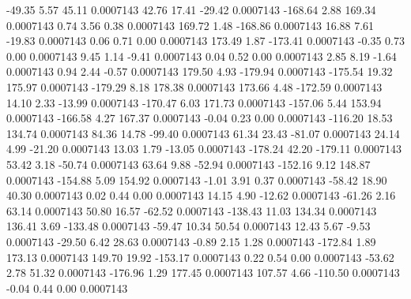       -49.35        5.57       45.11     0.0007143
       42.76       17.41      -29.42     0.0007143
     -168.64        2.88      169.34     0.0007143
        0.74        3.56        0.38     0.0007143
      169.72        1.48     -168.86     0.0007143
       16.88        7.61      -19.83     0.0007143
        0.06        0.71        0.00     0.0007143
      173.49        1.87     -173.41     0.0007143
       -0.35        0.73        0.00     0.0007143
        9.45        1.14       -9.41     0.0007143
        0.04        0.52        0.00     0.0007143
        2.85        8.19       -1.64     0.0007143
        0.94        2.44       -0.57     0.0007143
      179.50        4.93     -179.94     0.0007143
     -175.54       19.32      175.97     0.0007143
     -179.29        8.18      178.38     0.0007143
      173.66        4.48     -172.59     0.0007143
       14.10        2.33      -13.99     0.0007143
     -170.47        6.03      171.73     0.0007143
     -157.06        5.44      153.94     0.0007143
     -166.58        4.27      167.37     0.0007143
       -0.04        0.23        0.00     0.0007143
     -116.20       18.53      134.74     0.0007143
       84.36       14.78      -99.40     0.0007143
       61.34       23.43      -81.07     0.0007143
       24.14        4.99      -21.20     0.0007143
       13.03        1.79      -13.05     0.0007143
     -178.24       42.20     -179.11     0.0007143
       53.42        3.18      -50.74     0.0007143
       63.64        9.88      -52.94     0.0007143
     -152.16        9.12      148.87     0.0007143
     -154.88        5.09      154.92     0.0007143
       -1.01        3.91        0.37     0.0007143
      -58.42       18.90       40.30     0.0007143
        0.02        0.44        0.00     0.0007143
       14.15        4.90      -12.62     0.0007143
      -61.26        2.16       63.14     0.0007143
       50.80       16.57      -62.52     0.0007143
     -138.43       11.03      134.34     0.0007143
      136.41        3.69     -133.48     0.0007143
      -59.47       10.34       50.54     0.0007143
       12.43        5.67       -9.53     0.0007143
      -29.50        6.42       28.63     0.0007143
       -0.89        2.15        1.28     0.0007143
     -172.84        1.89      173.13     0.0007143
      149.70       19.92     -153.17     0.0007143
        0.22        0.54        0.00     0.0007143
      -53.62        2.78       51.32     0.0007143
     -176.96        1.29      177.45     0.0007143
      107.57        4.66     -110.50     0.0007143
       -0.04        0.44        0.00     0.0007143
